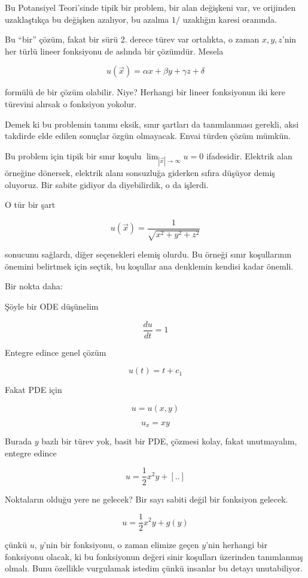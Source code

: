 \documentclass[12pt,fleqn]{article}\usepackage{../../common}
\begin{document}
Bu Potansiyel Teori'sinde tipik bir problem, bir alan değişkeni var, ve
orijinden uzaklaştıkça bu değişken azalıyor, bu azalma $1 / $ uzaklığın
karesi oranında. 

Bu ``bir'' çözüm, fakat bir sürü 2. derece türev var ortalıkta, o zaman
$x,y,z$'nin her türlü lineer fonksiyonu de aslında bir çözümdür. Mesela

$$ u(\vec{x}) = \alpha x + \beta y + \gamma z + \delta $$

formülü de bir çözüm olabilir. Niye? Herhangi bir lineer fonksiyonun iki
kere türevini alırsak o fonksiyon yokolur. 

Demek ki bu problemin tanımı eksik, sınır şartları da tanımlanması gerekli,
aksi takdirde elde edilen sonuçlar özgün olmayacak. Envai türden çözüm
mümkün. 

Bu problem için tipik bir sınır koşulu $\lim_{|\vec{x}|\to \infty} u = 0$
ifadesidir. Elektrik alan örneğine dönersek, elektrik alanı sonsuzluğa
giderken sıfıra düşüyor demiş oluyoruz. Bir sabite gidiyor da diyebilirdik,
o da işlerdi. 

O tür bir şart 

$$ u(\vec{x}) = \frac{1}{\sqrt{x^2+y^2+z^2}} $$

sonucunu sağlardı, diğer seçenekleri elemiş olurdu. Bu örneği sınır
koşullarının önemini belirtmek için seçtik, bu koşullar ana denklemin
kendisi kadar önemli. 

Bir nokta daha:

Şöyle bir ODE düşünelim

$$ \frac{du}{dt} = 1 $$

Entegre edince genel çözüm

$$ u(t) = t + c_1 $$

Fakat PDE için

$$ u = u(x,y) $$

$$ u_x = xy $$

Burada $y$ bazlı bir türev yok, basit bir PDE, çözmesi kolay, fakat unutmayalım,
entegre edince

$$ u = \frac{1}{2}x^2y + [..] $$

Noktaların olduğu yere ne gelecek? Bir sayı sabiti değil bir fonksiyon
gelecek. 

$$ u = \frac{1}{2}x^2y + g(y) $$

çünkü $u$, $y$'nin bir fonksiyonu, o zaman elimize geçen $y$'nin herhangi
bir fonksiyonu olacak, ki bu fonksiyonun değeri sinir koşulları üzerinden
tanımlanmış olmalı. Bunu özellikle vurgulamak istedim çünkü insanlar bu
detayı unutabiliyor.
\end{document}
